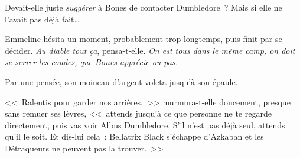 Devait-elle juste \emph{suggérer} à Bones de contacter Dumbledore~? Mais si elle ne l'avait pas déjà fait…

Emmeline hésita un moment, probablement trop longtemps, puis finit par se décider. \emph{Au diable tout ça}, pensa-t-elle. \emph{On est tous dans le même camp, on doit se serrer les coudes, que Bones apprécie ou pas.}

Par une pensée, son moineau d'argent voleta jusqu'à son épaule.

<<~Ralentis pour garder nos arrières,~>> murmura-t-elle doucement, presque sans remuer ses lèvres, <<~attends jusqu'à ce que personne ne te regarde directement, puis vas voir Albus Dumbledore. S'il n'est pas déjà seul, attends qu'il le soit. Et dis-lui cela~: Bellatrix Black s'échappe d'Azkaban et les Détraqueurs ne peuvent pas la trouver.~>>

